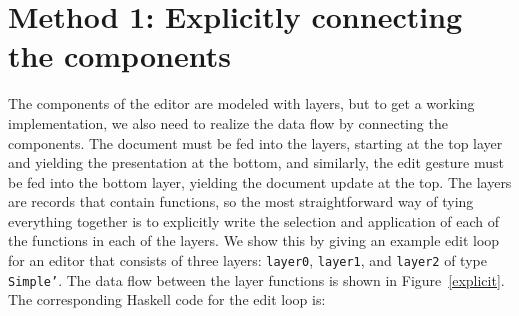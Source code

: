 %																
%																
%																
\section{Method 1: Explicitly connecting the components} \label{sectsimple}

The components of the editor are modeled with layers, but to get a working implementation, we also need to realize the data flow by connecting the components. The document must be fed into the layers, starting at the top layer and yielding the presentation at the bottom, and similarly, the edit gesture must be fed into the bottom layer, yielding the document update at the top. The layers are records that contain functions, so the most straightforward way of tying everything together is to explicitly write the selection and application of each of the functions in each of the layers. We show this by giving an example edit loop for an editor that consists of three layers: \texttt{layer0}, \texttt{layer1}, and \texttt{layer2} of type \texttt{Simple'}. The data flow between the layer functions is shown in Figure~\ref{explicit}. The corresponding Haskell code for the edit loop is:

